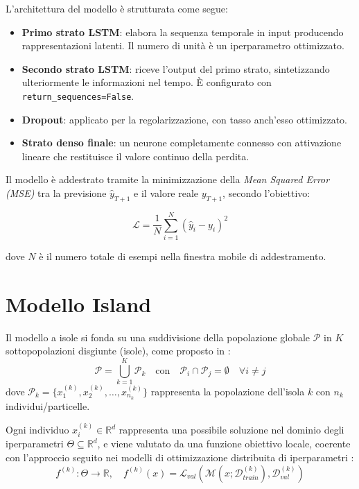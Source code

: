 \documentclass{article}
\begin{document}
L’architettura del modello è strutturata come segue:

\begin{itemize}
    \item \textbf{Primo strato LSTM}: elabora la sequenza temporale in input producendo rappresentazioni latenti. Il numero di unità è un iperparametro ottimizzato.
    \item \textbf{Secondo strato LSTM}: riceve l'output del primo strato, sintetizzando ulteriormente le informazioni nel tempo. È configurato con \verb|return_sequences=False|.
    \item \textbf{Dropout}: applicato per la regolarizzazione, con tasso anch'esso ottimizzato.
    \item \textbf{Strato denso finale}: un neurone completamente connesso con attivazione lineare che restituisce il valore continuo della perdita.
\end{itemize}

Il modello è addestrato tramite la minimizzazione della \textit{Mean Squared Error (MSE)} tra la 
previsione $\hat{y}_{T+1}$ e il valore reale $y_{T+1}$, secondo l’obiettivo:

\begin{equation}
\mathcal{L} = \frac{1}{N} \sum_{i=1}^N \left( \hat{y}_{i} - y_{i} \right)^2
\end{equation}

dove $N$ è il numero totale di esempi nella finestra mobile di addestramento.

\section{Modello Island}

Il modello a isole si fonda su una suddivisione della popolazione globale $\mathcal{P}$ in $K$ sottopopolazioni 
disgiunte (isole), come proposto in \cite{alba2002parallelism, tomassini2005spatially}:
\begin{equation}
\mathcal{P} = \bigcup_{k=1}^K \mathcal{P}_k \quad \text{con} \quad \mathcal{P}_i \cap \mathcal{P}_j = \emptyset \quad \forall i \neq j
\end{equation}
dove $\mathcal{P}_k = \{x_1^{(k)}, x_2^{(k)}, \dots, x_{n_k}^{(k)}\}$ rappresenta la popolazione dell'isola $k$ con $n_k$ individui/particelle.

Ogni individuo $x_i^{(k)} \in \mathbb{R}^d$ rappresenta una possibile soluzione nel dominio degli 
iperparametri $\Theta \subseteq \mathbb{R}^d$, e viene valutato da una funzione obiettivo locale, 
coerente con l'approccio seguito nei modelli di ottimizzazione distribuita di iperparametri \cite{li2019openbox}:
\begin{equation}
f^{(k)} : \Theta \to \mathbb{R}, \quad f^{(k)}(x) = \mathcal{L}_{val}(\mathcal{M}(x; \mathcal{D}_{train}^{(k)}), \mathcal{D}_{val}^{(k)})
\end{equation}
\end{document}
